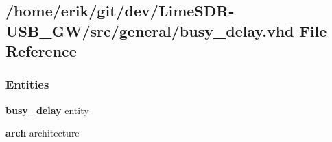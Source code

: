 \subsection{/home/erik/git/dev/\+Lime\+S\+D\+R-\/\+U\+S\+B\+\_\+\+G\+W/src/general/busy\+\_\+delay.vhd File Reference}
\label{busy__delay_8vhd}
\subsubsection*{Entities}
\begin{DoxyCompactItemize}
\item 
{\bf busy\+\_\+delay} entity
\item 
{\bf arch} architecture
\end{DoxyCompactItemize}
